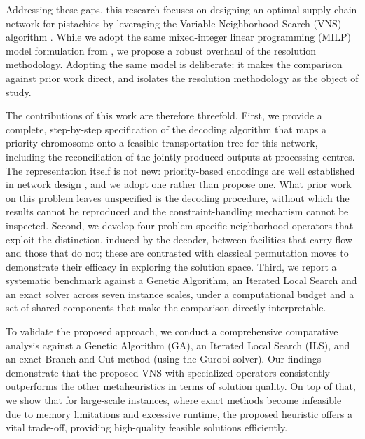 \documentclass[preprint,12pt,authoryear]{elsarticle}
\begin{document}
Addressing these gaps, this research focuses on designing an optimal supply chain network for pistachios by leveraging the Variable Neighborhood Search (VNS) algorithm \citep{gendreau2010}. 
While we adopt the same mixed-integer linear programming (MILP) model formulation from \cite{rajabi2023}, we propose a robust overhaul of the resolution methodology. Adopting the same
model is deliberate: it makes the comparison against prior work direct, and isolates the resolution methodology as the object of study.

The contributions of this work are therefore threefold. First, we provide a complete, step-by-step specification of the decoding algorithm that maps a priority chromosome onto a
feasible transportation tree for this network, including the reconciliation of the jointly produced outputs at processing centres. The representation itself is not new: priority-based
encodings are well established in network design \citep{gen2006, altiparmak2006}, and we adopt one rather than propose one. What prior work on this problem leaves unspecified is the
decoding procedure, without which the results cannot be reproduced and the constraint-handling mechanism cannot be inspected. Second, we develop four problem-specific neighborhood
operators that exploit the distinction, induced by the decoder, between facilities that carry flow and those that do not; these are contrasted with classical permutation moves to
demonstrate their efficacy in exploring the solution space. Third, we report a systematic benchmark against a Genetic Algorithm, an Iterated Local Search and an exact solver across
seven instance scales, under a computational budget and a set of shared components that make the comparison directly interpretable.

To validate the proposed approach, we conduct a comprehensive comparative analysis against a Genetic Algorithm (GA), an Iterated Local Search (ILS), and an exact Branch-and-Cut method 
(using the Gurobi solver). Our findings demonstrate that the proposed VNS with specialized operators consistently outperforms the other metaheuristics in terms of solution quality. 
On top of that, we show that for large-scale instances, where exact methods become infeasible due to memory limitations and excessive runtime, the proposed heuristic offers a vital trade-off, 
providing high-quality feasible solutions efficiently.
\end{document}
